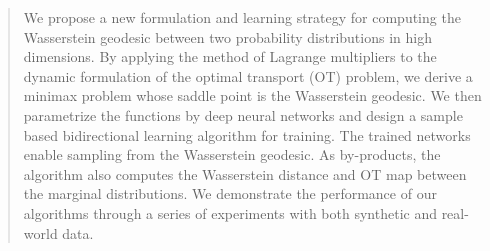 \documentclass{article}
\newcommand{\zha}[1]{{\color{red} Zha: #1}}
\begin{document}



\begin{abstract}
We propose a new formulation and learning strategy for computing the Wasserstein geodesic between two probability distributions in high dimensions. By applying the method of Lagrange multipliers to the dynamic formulation of the optimal transport (OT) problem, we derive a minimax problem whose saddle point is the Wasserstein geodesic. We then parametrize the functions by deep neural networks and design a sample based bidirectional learning algorithm for training. The trained networks enable sampling from the Wasserstein geodesic. As by-products, the algorithm also computes the Wasserstein distance and OT map between the marginal distributions. We demonstrate the performance of our algorithms through a series of experiments with both synthetic and real-world data. 

\end{abstract}
\end{document}
